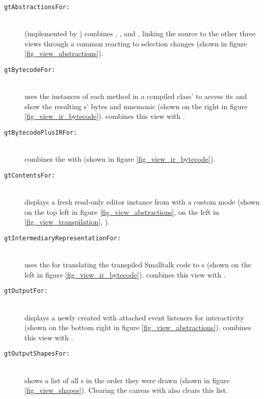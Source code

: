 \begin{description}
\item[\texttt{gtAbstractionsFor:}] \hfill \\
	(implemented by ) combines , ,  and , linking the source to the other three views through a common  reacting to selection changes (shown in figure \ref{fig_view_abstractions}).
\item[\texttt{gtBytecodeFor:}] \hfill \\
	uses the  instances of each method in a compiled class'  to access its  and show the resulting s' bytes and mnemonic (shown on the right in figure \ref{fig_view_ir_bytecode}).  combines this view with .
\item[\texttt{gtBytecodePlusIRFor:}] \hfill \\
	combines the  with  (shown in figure \ref{fig_view_ir_bytecode}).
\item[\texttt{gtContentsFor:}] \hfill \\
	displays a fresh read-only editor instance from  with a custom  mode (shown on the top left in figure \ref{fig_view_abstractions}, on the left in \ref{fig_view_transpilation}, \etc).
\item[\texttt{gtIntermediaryRepresentationFor:}] \hfill \\
	uses the  for translating the transpiled Smalltalk code to s (shown on the left in figure \ref{fig_view_ir_bytecode}).  combines this view with .
\item[\texttt{gtOutputFor:}] \hfill \\
	displays a newly created  with attached event listeners for interactivity (shown on the bottom right in figure \ref{fig_view_abstractions}).  combines this view with .
\item[\texttt{gtOutputShapesFor:}] \hfill \\
	shows a list of all s in the order they were drawn (shown in figure \ref{fig_view_shapes}). Clearing the canvas with  also clears this list.

\end{description}
